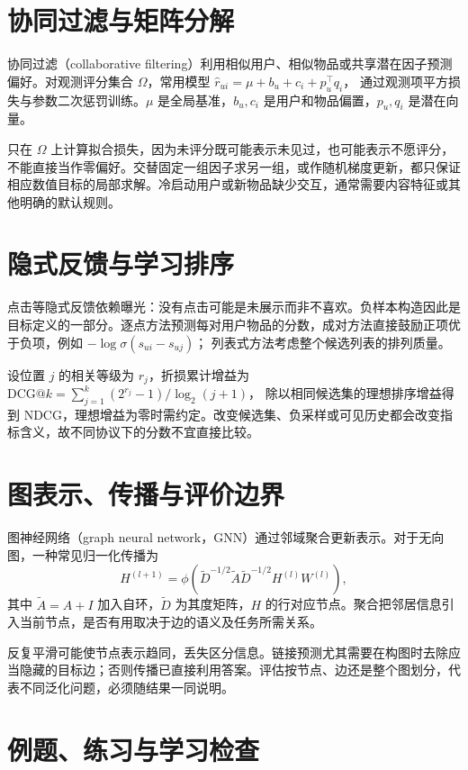 \section{协同过滤与矩阵分解}

协同过滤（collaborative filtering）利用相似用户、相似物品或共享潜在因子预测偏好。对观测评分集合 $\Omega$，常用模型
$\widehat r_{ui}=\mu+b_u+c_i+p_u^\top q_i$，
通过观测项平方损失与参数二次惩罚训练。$\mu$ 是全局基准，$b_u,c_i$ 是用户和物品偏置，$p_u,q_i$ 是潜在向量。

只在 $\Omega$ 上计算拟合损失，因为未评分既可能表示未见过，也可能表示不愿评分，不能直接当作零偏好。交替固定一组因子求另一组，或作随机梯度更新，都只保证相应数值目标的局部求解。冷启动用户或新物品缺少交互，通常需要内容特征或其他明确的默认规则。

\section{隐式反馈与学习排序}

点击等隐式反馈依赖曝光：没有点击可能是未展示而非不喜欢。负样本构造因此是目标定义的一部分。逐点方法预测每对用户物品的分数，成对方法直接鼓励正项优于负项，例如
$-\log\sigma(s_{ui}-s_{uj})$；
列表式方法考虑整个候选列表的排列质量。

设位置 $j$ 的相关等级为 $r_j$，折损累计增益为
$\mathrm{DCG}@k=\sum_{j=1}^k(2^{r_j}-1)/\log_2(j+1)$，
除以相同候选集的理想排序增益得到 NDCG，理想增益为零时需约定。改变候选集、负采样或可见历史都会改变指标含义，故不同协议下的分数不宜直接比较。

\section{图表示、传播与评价边界}

图神经网络（graph neural network，GNN）通过邻域聚合更新表示。对于无向图，一种常见归一化传播为
\begin{equation}
 H^{(l+1)}=\phi(\widetilde D^{-1/2}\widetilde A\widetilde D^{-1/2}H^{(l)}W^{(l)}),
 \label{eq:ml-graph-propagation}
\end{equation}
其中 $\widetilde A=A+I$ 加入自环，$\widetilde D$ 为其度矩阵，$H$ 的行对应节点。聚合把邻居信息引入当前节点，是否有用取决于边的语义及任务所需关系。

反复平滑可能使节点表示趋同，丢失区分信息。链接预测尤其需要在构图时去除应当隐藏的目标边；否则传播已直接利用答案。评估按节点、边还是整个图划分，代表不同泛化问题，必须随结果一同说明。

\section{例题、练习与学习检查}

